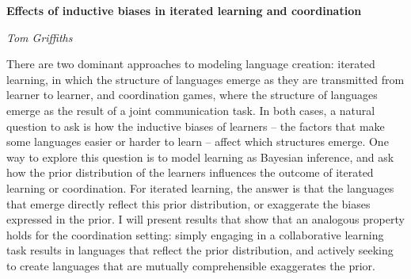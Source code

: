 \documentclass[10pt,letterpaper]{article}
\begin{document}
\begin{center}\textbf{Effects of inductive biases in iterated learning and coordination}\end{center}
\begin{center}\emph{Tom Griffiths}\end{center}

There are two dominant approaches to modeling language creation: iterated learning, in which the structure of languages emerge as they are transmitted from learner to learner, and coordination games, where the structure of languages emerge as the result of a joint communication task. In both cases, a natural question to ask is how the inductive biases of learners -- the factors that make some languages easier or harder to learn -- affect which structures emerge. One way to explore this question is to model learning as Bayesian inference, and ask how the prior distribution of the learners influences the outcome of iterated learning or coordination. For iterated learning, the answer is that the languages that emerge directly reflect this prior distribution, or exaggerate the biases expressed in the prior. I will present results that show that an analogous property holds for the coordination setting: simply engaging in a collaborative learning task results in languages that reflect the prior distribution, and actively seeking to create languages that are mutually comprehensible exaggerates the prior.



\setlength{\bibleftmargin}{.125in}
\setlength{\bibindent}{-\bibleftmargin}


\end{document}
